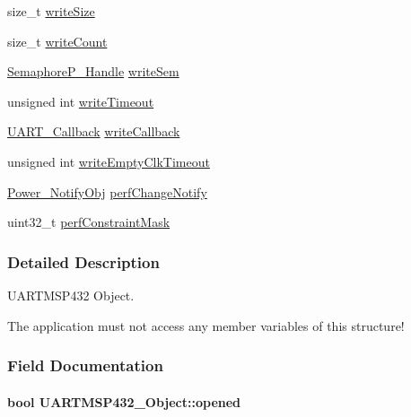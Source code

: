 \begin{DoxyCompactItemize}
\item 
size\+\_\+t \hyperlink{struct_u_a_r_t_m_s_p432___object_a3b2e41d54e13187835a0cf54d06aa5e5}{write\+Size}
\item 
size\+\_\+t \hyperlink{struct_u_a_r_t_m_s_p432___object_ad754153ad7fa71b910e664e1e441aec8}{write\+Count}
\item 
\hyperlink{_semaphore_p_8h_a7f34865f33e666455692544e5f12d1f2}{Semaphore\+P\+\_\+\+Handle} \hyperlink{struct_u_a_r_t_m_s_p432___object_adad95e7ce3b4f437e3f330f9a0cf29c5}{write\+Sem}
\item 
unsigned int \hyperlink{struct_u_a_r_t_m_s_p432___object_a18fb0e9d00f8cb2bab4190ae4f348d56}{write\+Timeout}
\item 
\hyperlink{_u_a_r_t_8h_a44620a9d91e0357ebc6f0a79984d9e1e}{U\+A\+R\+T\+\_\+\+Callback} \hyperlink{struct_u_a_r_t_m_s_p432___object_a189f41969adbcc31a740c982b075099a}{write\+Callback}
\item 
unsigned int \hyperlink{struct_u_a_r_t_m_s_p432___object_ae29a65ec55c1d69472d545c3aa6f71d8}{write\+Empty\+Clk\+Timeout}
\item 
\hyperlink{struct_power___notify_obj}{Power\+\_\+\+Notify\+Obj} \hyperlink{struct_u_a_r_t_m_s_p432___object_a55a77a6aece384b747ef647cbc8b2b44}{perf\+Change\+Notify}
\item 
uint32\+\_\+t \hyperlink{struct_u_a_r_t_m_s_p432___object_a6dff7cf786b5cbcc1cfb8726684aac1a}{perf\+Constraint\+Mask}
\end{DoxyCompactItemize}


\subsubsection{Detailed Description}
U\+A\+R\+T\+M\+S\+P432 Object. 

The application must not access any member variables of this structure! 

\subsubsection{Field Documentation}
\paragraph[{opened}]{\setlength{\rightskip}{0pt plus 5cm}bool U\+A\+R\+T\+M\+S\+P432\+\_\+\+Object\+::opened}\label{struct_u_a_r_t_m_s_p432___object_a56896783561056912d7d0b98dabbf423}
